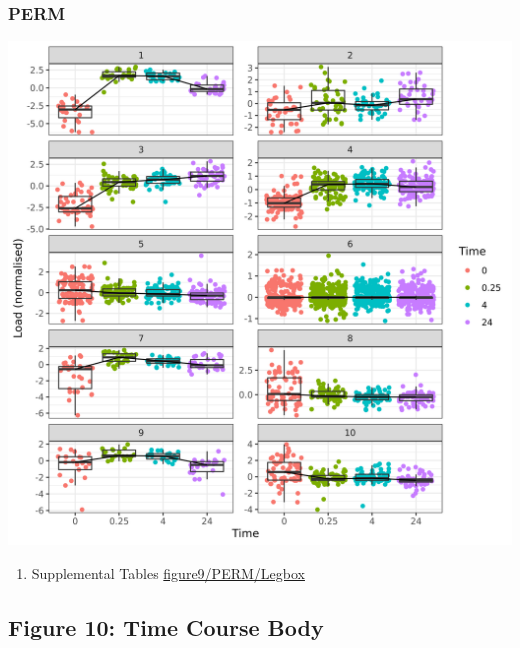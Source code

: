 \documentclass[11pt]{article}
\begin{document}
\subsubsection{PERM}
\label{sec:orgb3a3f0b}
\begin{center}
\includegraphics[width=.9\linewidth]{figure9/PERM/Legbox.png}
\end{center}
\begin{enumerate}
\item Supplemental Tables
\label{sec:orga3ff383}
\url{figure9/PERM/Legbox}
\end{enumerate}
\subsection{Figure 10: Time Course Body}
\label{sec:org4ec7d66}
\end{document}
